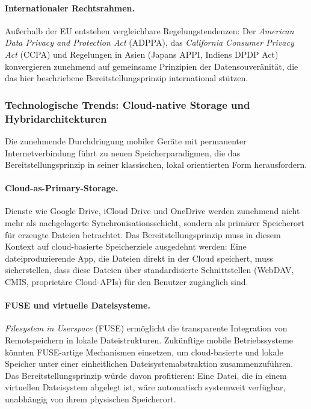 ﻿\documentclass[12pt, a4paper]{article}
\begin{document}
\paragraph{Internationaler Rechtsrahmen.}
Außerhalb der EU entstehen vergleichbare Regelungstendenzen: Der \emph{American Data
Privacy and Protection Act} (ADPPA), das \emph{California Consumer Privacy Act} (CCPA)
und Regelungen in Asien (Japans APPI, Indiens DPDP Act) konvergieren zunehmend auf
gemeinsame Prinzipien der Datensouveränität, die das hier beschriebene Bereitstellungs\-prinzip
international stützen.

\subsubsection{Technologische Trends: Cloud-native Storage und Hybridarchitekturen}

Die zunehmende Durchdringung mobiler Geräte mit permanenter Internetverbindung führt
zu neuen Speicherparadigmen, die das Bereitstellungsprinzip in seiner klassischen,
lokal orientierten Form herausfordern.

\paragraph{Cloud-as-Primary-Storage.}
Dienste wie Google Drive, iCloud Drive und OneDrive werden zunehmend nicht mehr als
nachgelagerte Synchronisationsschicht, sondern als primärer Speicherort für erzeugte
Dateien betrachtet. Das Bereitstellungsprinzip muss in diesem Kontext auf cloud-basierte
Speicherziele ausgedehnt werden: Eine dateiproduzierende App, die Dateien direkt in der
Cloud speichert, muss sicherstellen, dass diese Dateien über standardisierte
Schnittstellen (WebDAV, CMIS, proprietäre Cloud-APIs) für den Benutzer zugänglich sind.

\paragraph{FUSE und virtuelle Dateisysteme.}
\emph{Filesystem in Userspace} (FUSE) ermöglicht die transparente Integration von
Remotspeichern in lokale Dateistrukturen. Zukünftige mobile Betriebssysteme könnten
FUSE-artige Mechanismen einsetzen, um cloud-basierte und lokale Speicher unter einer
einheitlichen Dateisystemabstraktion zusammenzuführen. Das Bereitstellungsprinzip würde
davon profitieren: Eine Datei, die in einem virtuellen Dateisystem abgelegt ist, wäre
automatisch systemweit verfügbar, unabhängig von ihrem physischen Speicherort.
\end{document}
